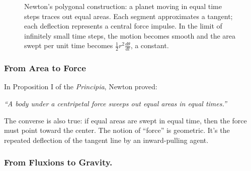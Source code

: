 \begin{figure}[H]
\centering
{}
\caption{Newton’s polygonal construction: a planet moving in equal time steps traces out equal areas. Each segment approximates a tangent; each deflection represents a central force impulse. In the limit of infinitely small time steps, the motion becomes smooth and the area swept per unit time becomes \( \frac{1}{2} r^2 \frac{d\theta}{dt} \), a constant.}
\end{figure}

\subsubsection{From Area to Force} 

In Proposition I of the \textit{Principia}, Newton proved:  

\textit{“A body under a centripetal force sweeps out equal areas in equal times.”}

The converse is also true: if equal areas are swept in equal time, then the force must point toward the center. The notion of “force” is geometric. It’s the repeated deflection of the tangent line by an inward-pulling agent.

\subsubsection{From Fluxions to Gravity.} 

